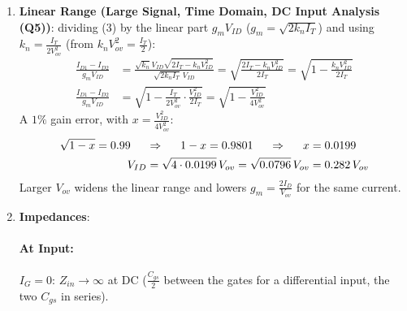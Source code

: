 \begin{enumerate}
    (perfectly matched halves give \(V_{o1} - V_{o2} = 0\) for any \(V_{ic}\)).
  \item \textbf{Linear Range (Large Signal, Time Domain, DC Input Analysis (Q5))}: dividing (3) by the linear part \(g_m V_{ID}\)
    (\(g_m = \sqrt{2 k_n I_T}\)) and using
    \(k_n = \frac{I_T}{2 V_{ov}^2}\) (from \(k_n V_{ov}^2 = \frac{I_T}{2}\)):
    \begin{align*}
      \frac{I_{D1} - I_{D2}}{g_m V_{ID}} &= \frac{\sqrt{k_n} V_{ID}\sqrt{2 I_T - k_n V_{ID}^2}}{\sqrt{2 k_n I_T}\, V_{ID}} = \sqrt{\frac{2 I_T - k_n V_{ID}^2}{2 I_T}} = \sqrt{1 - \frac{k_n V_{ID}^2}{2 I_T}} \\
      \frac{I_{D1} - I_{D2}}{g_m V_{ID}} &= \sqrt{1 - \frac{I_T}{2 V_{ov}^2} \cdot \frac{V_{ID}^2}{2 I_T}} = \sqrt{1 - \frac{V_{ID}^2}{4 V_{ov}^2}}
    \end{align*}
    A \(1\%\) gain error, with \(x = \frac{V_{ID}^2}{4 V_{ov}^2}\):
    \begin{align*}
      \sqrt{1 - x} = 0.99 \hspace{0.5cm} &\Rightarrow \hspace{0.5cm} 1 - x = 0.9801 \hspace{0.5cm} \Rightarrow \hspace{0.5cm} x = 0.0199 \\
      V_{ID} &= \sqrt{4 \cdot 0.0199}\, V_{ov} = \sqrt{0.0796}\, V_{ov} = 0.282\, V_{ov}
    \end{align*}
    Larger \(V_{ov}\) widens the linear range and lowers \(g_m = \frac{2 I_D}{V_{ov}}\)
    for the same current.
  \item \textbf{Impedances}:
    \paragraph{At Input:} \(I_G = 0\): \(Z_{in} \to \infty\) at DC (\(\frac{C_{gs}}{2}\) between the gates
    for a differential input, the two \(C_{gs}\) in series).

\end{enumerate}
